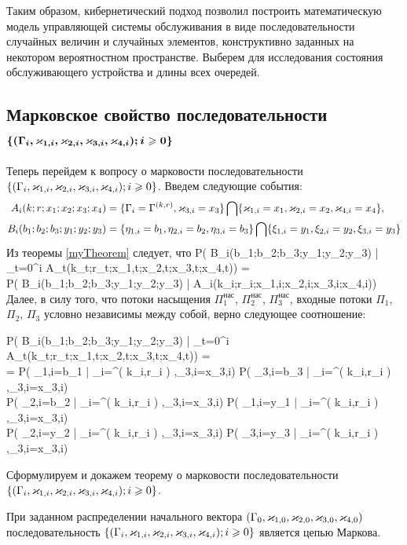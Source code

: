 \documentclass[a4paper,12pt,russian]{extarticle}
\newcommand{\G}{\Gamma}
\renewcommand{\P}[2]{P( #1 | #2)}
\newcommand{\Mark}{\{(\G_i, \vk_{1,i}, \vk_{2,i}, \vk_{3,i}, \vk_{4,i}); i \geqslant 0\}}
\newcommand{\ga}[1]{\Gamma^{\left( #1 \right)} }
\begin{document}
Таким образом, кибернетический подход позволил построить математическую модель управляющей системы обслуживания в виде последовательности случайных величин и случайных элементов, конструктивно заданных на некотором вероятностном пространстве. Выберем для исследования состояния обслуживающего устройства и длины всех очередей.

\subsection[Марковское свойство последовательности $\boldsymbol{\Mark}$]%
{Марковское свойство последовательности \\ $\boldsymbol{\Mark}$}

Теперь перейдем к вопросу о марковости последовательности $\Mark$. Введем следующие события:
\begin{align}
A_i(k;r;x_1;x_2;x_3;x_4) &= \{\G_i=\ga{k,r},\vk_{3,i}=x_3\}\bigcap \{\vk_{1,i}=x_1,\vk_{2,i}=x_2,\vk_{4,i}=x_4\},\\
B_i(b_1;b_2;b_3;y_1;y_2;y_3) &= \{\eta_{1,i}=b_1, \eta_{2,i}=b_2,\eta_{3,i}=b_3\} \bigcap \{\xi_{1,i}=y_1,\xi_{2,i}=y_2,\xi_{3,i}=y_3\}
\end{align}
Из теоремы \eqref{myTheorem} следует, что 
\ml
{
\P{B_i(b_1;b_2;b_3;y_1;y_2;y_3)}{\bigcap_{t=0}^{i} A_t(k_t;r_t;x_{1,t};x_{2,t};x_{3,t};x_{4,t})} = \\
\P{B_i(b_1;b_2;b_3;y_1;y_2;y_3)}{A_i(k_i;r_i;x_{1,i};x_{2,i};x_{3,i};x_{4,i})}
}
Далее, в силу того, что потоки насыщения $\Pi_1^{\mathrm{\text{нас}}}$,  $\Pi_2^{\mathrm{\text{нас}}}$, $\Pi_3^{\mathrm{\text{нас}}}$, входные потоки $\Pi_1$, $\Pi_2$, $\Pi_3$ условно независимы между собой, верно следующее соотношение:

\ml
{
\label{etaXiIndependence}
\P{B_i(b_1;b_2;b_3;y_1;y_2;y_3)}{\bigcap_{t=0}^{i} A_t(k_t;r_t;x_{1,t};x_{2,t};x_{3,t};x_{4,t})} = \\
= \P{\eta_{1,i}=b_1}{\G_i=\ga{k_i,r_i},\vk_{3,i}=x_{3,i}} \times 
\P{\eta_{3,i}=b_3}{\G_i=\ga{k_i,r_i},\vk_{3,i}=x_{3,i}} \times \\
\P{\eta_{2,i}=b_2}{\G_i=\ga{k_i,r_i},\vk_{3,i}=x_{3,i}} \times \P{\xi_{1,i}=y_1}{\G_i=\ga{k_i,r_i},\vk_{3,i}=x_{3,i}} \times\\
\times  \P{\xi_{2,i}=y_2}{\G_i=\ga{k_i,r_i},\vk_{3,i}=x_{3,i}} \times 
\P{\xi_{3,i}=y_3}{\G_i=\ga{k_i,r_i},\vk_{3,i}=x_{3,i}}
}

Сформулируем и докажем теорему о марковости последовательности \linebreak$\Mark$.
\begin{theorem}
При заданном распределении начального вектора $(\G_0,\vk_{1,0},\vk_{2,0},\vk_{3,0},\vk_{4,0})$ последовательность $\Mark$ является цепью Маркова. 
\end{theorem}
\end{document}
